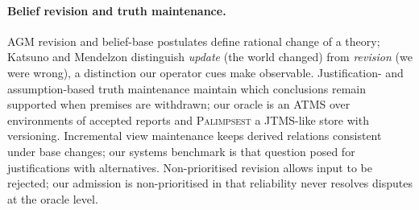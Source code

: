 \documentclass[11pt]{article}
\newcommand{\pal}{\textsc{Palimpsest}}
\begin{document}
\paragraph{Belief revision and truth maintenance.} AGM revision \citep{agm1985} and belief-base postulates \citep{hansson1999} define rational change of a theory; Katsuno and Mendelzon \citep{km1991} distinguish \emph{update} (the world changed) from \emph{revision} (we were wrong), a distinction our operator cues make observable. Justification- and assumption-based truth maintenance \citep{doyle1979,dekleer1986} maintain which conclusions remain supported when premises are withdrawn; our oracle is an ATMS over environments of accepted reports and \pal{} a JTMS-like store with versioning. Incremental view maintenance \citep{gupta1993} keeps derived relations consistent under base changes; our systems benchmark is that question posed for justifications with alternatives. Non-prioritised revision \citep{hansson1997,makinson1997} allows input to be rejected; our admission is non-prioritised in that reliability never resolves disputes at the oracle level.
\end{document}
